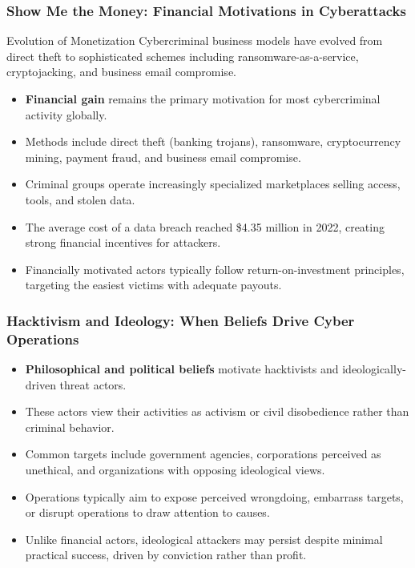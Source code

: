 \documentclass{beamer}
\begin{document}
\begin{frame}
    \frametitle{Show Me the Money: Financial Motivations in Cyberattacks}
    
    \begin{alertblock}{Evolution of Monetization}
        Cybercriminal business models have evolved from direct theft to sophisticated schemes including ransomware-as-a-service, cryptojacking, and business email compromise.
    \end{alertblock}
    
    \begin{itemize}
        \item \textbf{Financial gain} remains the primary motivation for most cybercriminal activity globally.
        \item Methods include direct theft (banking trojans), ransomware, cryptocurrency mining, payment fraud, and business email compromise.
        \item Criminal groups operate increasingly specialized marketplaces selling access, tools, and stolen data.
        \item The average cost of a data breach reached \$4.35 million in 2022, creating strong financial incentives for attackers.
        \item Financially motivated actors typically follow return-on-investment principles, targeting the easiest victims with adequate payouts.
    \end{itemize}
\end{frame}

\begin{frame}
    \frametitle{Hacktivism and Ideology: When Beliefs Drive Cyber Operations}
    
    \begin{itemize}
        \item \textbf{Philosophical and political beliefs} motivate hacktivists and ideologically-driven threat actors.
        \item These actors view their activities as activism or civil disobedience rather than criminal behavior.
        \item Common targets include government agencies, corporations perceived as unethical, and organizations with opposing ideological views.
        \item Operations typically aim to expose perceived wrongdoing, embarrass targets, or disrupt operations to draw attention to causes.
        \item Unlike financial actors, ideological attackers may persist despite minimal practical success, driven by conviction rather than profit.
    \end{itemize}
\end{frame}
\end{document}
